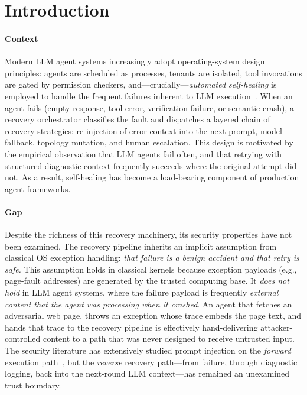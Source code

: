 
\section{Introduction}
\label{sec:introduction}

\paragraph{Context}
Modern LLM agent systems increasingly adopt operating-system design principles: agents are scheduled as processes, tenants are isolated, tool invocations are gated by permission checkers, and---crucially---\emph{automated self-healing} is employed to handle the frequent failures inherent to LLM execution~\cite{autogen,swe-agent,omo}. When an agent fails (empty response, tool error, verification failure, or semantic crash), a recovery orchestrator classifies the fault and dispatches a layered chain of recovery strategies: re-injection of error context into the next prompt, model fallback, topology mutation, and human escalation. This design is motivated by the empirical observation that LLM agents fail often, and that retrying with structured diagnostic context frequently succeeds where the original attempt did not. As a result, self-healing has become a load-bearing component of production agent frameworks.

\paragraph{Gap}
Despite the richness of this recovery machinery, its security properties have not been examined. The recovery pipeline inherits an implicit assumption from classical OS exception handling: \emph{that failure is a benign accident and that retry is safe.} This assumption holds in classical kernels because exception payloads (e.g., page-fault addresses) are generated by the trusted computing base. It \emph{does not hold} in LLM agent systems, where the failure payload is frequently \emph{external content that the agent was processing when it crashed}. An agent that fetches an adversarial web page, throws an exception whose trace embeds the page text, and hands that trace to the recovery pipeline is effectively hand-delivering attacker-controlled content to a path that was never designed to receive untrusted input. The security literature has extensively studied prompt injection on the \emph{forward} execution path~\cite{greshake2023indirect,liu2024formalizing}, but the \emph{reverse} recovery path---from failure, through diagnostic logging, back into the next-round LLM context---has remained an unexamined trust boundary.

